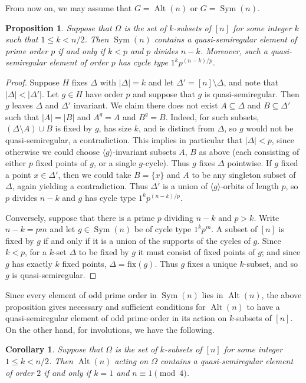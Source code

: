 \documentclass{article}
\newtheorem{cor}[thm]{Corollary}
\newtheorem{prop}[thm]{Proposition}
\theoremstyle{remark}
\theoremstyle{definition}
\newcounter{claim}[thm]
\DeclareMathOperator{\Alt}{Alt}
\DeclareMathOperator{\Sym}{Sym}
\newcommand{\qsr}{quasi-semiregular}
\newcommand{\qsre}{quasi-semiregular element}
\begin{document}
From now on, we may assume that $G=\Alt(n)$ or $G=\Sym(n)$.

\begin{prop}
\label{prop:k-set stab}
    Suppose that $\Omega$ is the set of $k$-subsets of $[n]$ for some integer $k$ such that $1\leqslant k < n/2$. Then $\Sym(n)$ contains a {\qsre} of prime order $p$ if and only if $k<p$ and $p$ divides $n-k$. Moreover, such a {\qsre} of order $p$ has cycle type $1^kp^{(n-k)/p}$.
\end{prop}
\begin{proof}
    Suppose $H$ fixes $\Delta$ with $|\Delta|=k$ and let $\Delta' = [n] \setminus \Delta$, and note that $|\Delta|<|\Delta'|$. Let $g\in H$ have order $p$ and suppose that $g$ is {\qsr}. Then $g$ leaves $\Delta$ and $\Delta'$ invariant. We claim there does not exist $A \subseteq \Delta$ and $B \subseteq   \Delta'$ such that $|A|=|B|$ and  $A^g =A$ and $B^g=B$. Indeed, for such subsets, $(\Delta \setminus A) \cup B$ is fixed by $g$, has size $k$, and is distinct from $\Delta$, so $g$ would not be {\qsr}, a contradiction.
    This implies in particular that $|\Delta|<p$, since otherwise we could choose $\langle g\rangle$-invariant subsets $A$, $B$ as above (each consisting of either $p$ fixed points of $g$, or a single $g$-cycle).  Thus $g$ fixes $\Delta$ pointwise. If $g$ fixed a point $x\in\Delta'$, then we could take $B=\{x\}$ and $A$ to be any singleton subset of $\Delta$, again yielding a contradiction. Thus $\Delta'$ is a union of $\langle g\rangle$-orbits of length $p$, so $p$ divides $n-k$ and  $g$ has cycle type $1^kp^{(n-k)/p}$.
    
    
    Conversely, suppose that there is a prime $p$ dividing $n-k$ and $p>k$. Write $n-k = pm$ and let $g\in \Sym(n)$ be of cycle type $1^kp^m$. A subset of $[n]$ is fixed by $g$ if and only if it is a union of the supports of the cycles of $g$.  Since $k< p$, for a $k$-set $\Delta$ to be fixed by $g$ it must consist of fixed points of $g$; and since $g$ has exactly $k$ fixed points, $\Delta = \mathrm{fix}(g)$. Thus $g$ fixes a unique $k$-subset, and so $g$ is {\qsr}.
\end{proof}

 
Since every element of odd prime order in $\Sym(n)$ lies in $\Alt(n)$, the above proposition gives necessary and sufficient conditions for $\Alt(n)$ to have a {\qsre} of odd prime order in its action on $k$-subsets of $[n]$. On the other hand, for involutions, we  have the following.


\begin{cor}
        Suppose that $\Omega$ is the set of $k$-subsets of $[n]$ for some integer $1\leqslant k < n/2$. Then $\Alt(n)$ acting on $\Omega$ contains a {\qsre} of   order $2$ if and only if $k=1$ and $n\equiv 1 \pmod{4}$. 
\end{cor}
 
\end{document}

